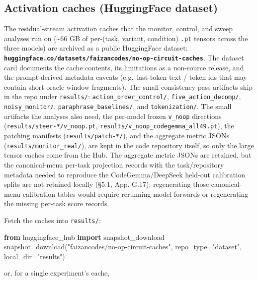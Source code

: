 \documentclass[
  11pt,
  a4paper]{article}
\newenvironment{Shaded}{}{}
\newcommand{\ImportTok}[1]{\textcolor[rgb]{0.00,0.50,0.00}{\textbf{#1}}}
\newcommand{\NormalTok}[1]{#1}
\newcommand{\OperatorTok}[1]{\textcolor[rgb]{0.40,0.40,0.40}{#1}}
\newcommand{\StringTok}[1]{\textcolor[rgb]{0.25,0.44,0.63}{#1}}
\begin{document}
\subsection{Activation caches (HuggingFace
dataset)}\label{activation-caches-huggingface-dataset}

The residual-stream activation caches that the monitor, control, and
sweep analyses run on (\textasciitilde66 GB of per-(task, variant,
condition) \texttt{.pt} tensors across the three models) are archived as
a public HuggingFace dataset:
\textbf{\texttt{huggingface.co/datasets/faizancodes/no-op-circuit-caches}}.
The dataset card documents the cache contents, its limitations as a
non-source release, and the prompt-derived metadata caveats
(e.g.~last-token text / token ids that may contain short oracle-window
fragments). The small consistency-pass artifacts ship in the repo under
\texttt{results/}: \texttt{action\_order\_control/},
\texttt{five\_action\_decomp/}, \texttt{noisy\_monitor/},
\texttt{paraphrase\_baselines/}, and \texttt{tokenization/}. The small
artifacts the analyses also need, the per-model frozen \texttt{v\_noop}
directions (\texttt{results/steer-*/v\_noop.pt},
\texttt{results/v\_noop\_codegemma\_all49.pt}), the patching manifests
(\texttt{results/patch-*/}), and the aggregate metric JSONs
(\texttt{results/monitor\_real/}), are kept in the code repository
itself, so only the large tensor caches come from the Hub. The aggregate
metric JSONs are retained, but the canonical-menu per-task projection
records with the task/repository metadata needed to reproduce the
CodeGemma/DeepSeek held-out calibration splits are not retained locally
(\S{}5.1, App. G.17); regenerating those canonical-menu calibration tables
would require rerunning model forwards or regenerating the missing
per-task score records.

Fetch the caches into \texttt{results/}:

\begin{Shaded}
\begin{Highlighting}[]
\ImportTok{from}\NormalTok{ huggingface\_hub }\ImportTok{import}\NormalTok{ snapshot\_download}
\NormalTok{snapshot\_download(}\StringTok{"faizancodes/no{-}op{-}circuit{-}caches"}\NormalTok{,}
\NormalTok{ repo\_type}\OperatorTok{=}\StringTok{"dataset"}\NormalTok{, local\_dir}\OperatorTok{=}\StringTok{"results"}\NormalTok{)}
\end{Highlighting}
\end{Shaded}

or, for a single experiment's cache,
\end{document}
